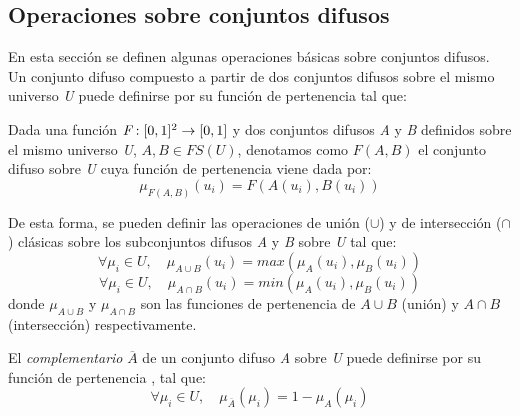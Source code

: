 \subsection{Operaciones sobre conjuntos difusos}
En esta sección se definen algunas operaciones básicas sobre conjuntos difusos. Un conjunto difuso compuesto a partir de dos conjuntos difusos sobre el mismo universo \emph{U} puede definirse por su función de pertenencia tal que:
\begin{definition}
Dada una función \begin{math}\emph{F}:[0,1]^2\rightarrow[0,1]\end{math} y dos conjuntos difusos \emph{A} y \emph{B} definidos sobre el mismo universo \emph{U}, \begin{math}A,B\in FS(U)\end{math}, denotamos como \begin{math}F(A,B)\end{math} el conjunto difuso sobre \emph{U} cuya función de pertenencia viene dada por:
\begin{equation}
\mu_{F(A,B)}(u_{i}) = F(A(u_{i}),B(u_{i}))
\end{equation}
\end{definition}
De esta forma, se pueden definir las operaciones de unión ($\cup$) y de intersección ($\cap$) clásicas sobre los subconjuntos difusos \emph{A} y \emph{B} sobre \emph{U} \cite{dubois1980} tal que:
\begin{equation}
\forall\mu_{i}\in U,\quad\mu_{A\cup B}(u_{i}) = max(\mu_{A}(u_{i}),\mu_{B}(u_{i}))
\end{equation}
\begin{equation}
\forall\mu_{i}\in U,\quad\mu_{A\cap B}(u_{i}) = min(\mu_{A}(u_{i}),\mu_{B}(u_{i}))
\end{equation}
donde $\mu_{A\cup B}$ y $\mu_{A\cap B}$ son las funciones de pertenencia de $A\cup B$ (unión) y $A\cap B$ (intersección) respectivamente.
\begin{definition}
El \emph{complementario} \emph{$\overline{A}$} de un conjunto difuso \emph{A} sobre \emph{U} puede definirse por su función de pertenencia \cite{Zadeh65}, tal que:
\begin{equation}
\forall \mu_{i} \in U, \quad \mu_{\overline{A}}(\mu_{i}) = 1 - \mu_{A}(\mu_{i})
\end{equation}
\end{definition}


